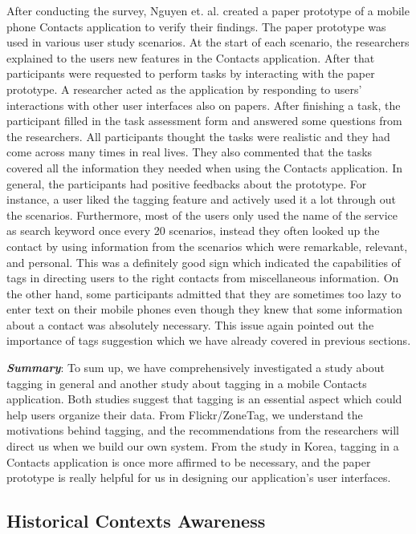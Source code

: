 After conducting the survey, Nguyen et. al. created a paper prototype of a mobile phone Contacts application to verify their findings. The paper prototype was used in various user study scenarios. At the start of each scenario, the researchers explained to the users new features in the Contacts application. After that participants were requested to perform tasks by interacting with the paper prototype. A researcher acted as the application by responding to users' interactions with other user interfaces also on papers. After finishing a task, the participant filled in the task assessment form and answered some questions from the researchers. All participants thought the tasks were realistic and they had come across many times in real lives. They also commented that the tasks covered all the information they needed when using the Contacts application. In general, the participants had positive feedbacks about the prototype. For instance, a user liked the tagging feature and actively used it a lot through out the scenarios. Furthermore, most of the users only used the name of the service as search keyword once every 20 scenarios, instead they often looked up the contact by using information from the scenarios which were remarkable, relevant, and personal. This was a definitely good sign which indicated the capabilities of tags in directing users to the right contacts from miscellaneous information. On the other hand, some participants admitted that they are sometimes too lazy to enter text on their mobile phones even though they knew that some information about a contact was absolutely necessary. This issue again pointed out the importance of tags suggestion which we have already covered in previous sections.

\textit{\textbf{Summary}}: To sum up, we have comprehensively investigated a study about tagging in general and another study about tagging in a mobile Contacts application. Both studies suggest that tagging is an essential aspect which could help users organize their data. From Flickr/ZoneTag, we understand the motivations behind tagging, and the recommendations from the researchers will direct us when we build our own system. From the study in Korea, tagging in a Contacts application is once more affirmed to be necessary, and the paper prototype is really helpful for us in designing our application's user interfaces.

\subsection{Historical Contexts Awareness}
\label{section:Context_Awareness}

